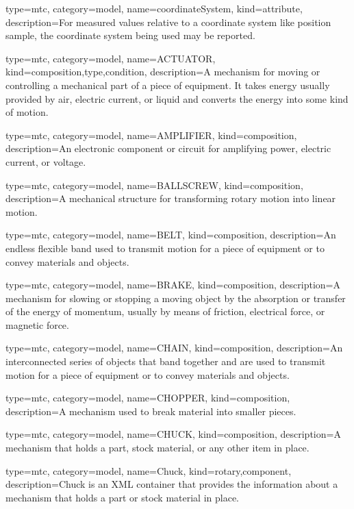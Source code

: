 {
  type=mtc,
  category=model,
  name={coordinateSystem},
  kind={attribute},
  description={For measured values relative to a coordinate system like \gls{position sample}, the coordinate system being used may be reported.}
}


{
  type=mtc,
  category=model,
  name={ACTUATOR},
  kind={composition,type,condition},
  description={A mechanism for moving or controlling a mechanical part of a piece of equipment.   \newline It takes energy usually provided by air, electric current, or liquid and converts the energy into some kind of motion. }
}


{
  type=mtc,
  category=model,
  name={AMPLIFIER},
  kind={composition},
  description={An electronic component or circuit for amplifying power, electric current, or voltage.}
}


{
  type=mtc,
  category=model,
  name={BALLSCREW},
  kind={composition},
  description={A mechanical structure for transforming rotary motion into linear motion.}
}


{
  type=mtc,
  category=model,
  name={BELT},
  kind={composition},
  description={An endless flexible band used to transmit motion for a piece of equipment or to convey materials and objects.}
}


{
  type=mtc,
  category=model,
  name={BRAKE},
  kind={composition},
  description={A mechanism for slowing or stopping a moving object by the absorption or transfer of the energy of momentum, usually by means of friction, electrical force, or magnetic force.}
}


{
  type=mtc,
  category=model,
  name={CHAIN},
  kind={composition},
  description={An interconnected series of objects that band together and are used to transmit motion for a piece of equipment or to convey materials and objects.}
}


{
  type=mtc,
  category=model,
  name={CHOPPER},
  kind={composition},
  description={A mechanism used to break material into smaller pieces.}
}


{
  type=mtc,
  category=model,
  name={CHUCK},
  kind={composition},
  description={A mechanism that holds a part, stock material, or any other item in place.}
}


{
  type=mtc,
  category=model,
  name={Chuck},
  kind={rotary,component},
  description={Chuck is an XML container that provides the information about a mechanism that holds a part or stock material in place.}
}


